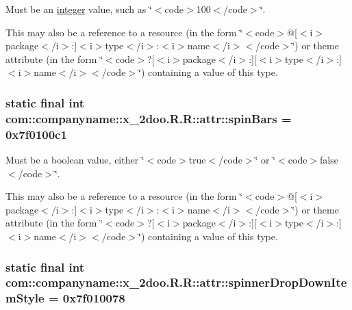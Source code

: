 Must be an \hyperlink{classcom_1_1companyname_1_1x__2doo_1_1_r_1_1integer}{integer} value, such as \char`\"{}$<$code$>$100$<$/code$>$\char`\"{}. 

This may also be a reference to a resource (in the form \char`\"{}$<$code$>$@\mbox{[}$<$i$>$package$<$/i$>$:\mbox{]}$<$i$>$type$<$/i$>$:$<$i$>$name$<$/i$>$$<$/code$>$\char`\"{}) or theme attribute (in the form \char`\"{}$<$code$>$?\mbox{[}$<$i$>$package$<$/i$>$:\mbox{]}\mbox{[}$<$i$>$type$<$/i$>$:\mbox{]}$<$i$>$name$<$/i$>$$<$/code$>$\char`\"{}) containing a value of this type. \hypertarget{classcom_1_1companyname_1_1x__2doo_1_1_r_1_1attr_20ca8839c7cbe451e133f9ae5200d5e0}{
\subsubsection[{spinBars}]{\setlength{\rightskip}{0pt plus 5cm}static final int com::companyname::x\_\-2doo.R.R::attr::spinBars = 0x7f0100c1}}
\label{classcom_1_1companyname_1_1x__2doo_1_1_r_1_1attr_20ca8839c7cbe451e133f9ae5200d5e0}


Must be a boolean value, either \char`\"{}$<$code$>$true$<$/code$>$\char`\"{} or \char`\"{}$<$code$>$false$<$/code$>$\char`\"{}. 

This may also be a reference to a resource (in the form \char`\"{}$<$code$>$@\mbox{[}$<$i$>$package$<$/i$>$:\mbox{]}$<$i$>$type$<$/i$>$:$<$i$>$name$<$/i$>$$<$/code$>$\char`\"{}) or theme attribute (in the form \char`\"{}$<$code$>$?\mbox{[}$<$i$>$package$<$/i$>$:\mbox{]}\mbox{[}$<$i$>$type$<$/i$>$:\mbox{]}$<$i$>$name$<$/i$>$$<$/code$>$\char`\"{}) containing a value of this type. \hypertarget{classcom_1_1companyname_1_1x__2doo_1_1_r_1_1attr_2a264d0ce8c5b03dd4adc0a12afddf80}{
\subsubsection[{spinnerDropDownItemStyle}]{\setlength{\rightskip}{0pt plus 5cm}static final int com::companyname::x\_\-2doo.R.R::attr::spinnerDropDownItemStyle = 0x7f010078}}
\label{classcom_1_1companyname_1_1x__2doo_1_1_r_1_1attr_2a264d0ce8c5b03dd4adc0a12afddf80}


